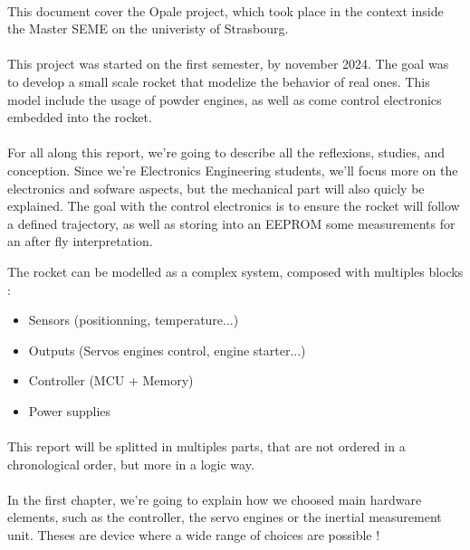 \paragraph{}
This document cover the Opale project, which took place in the context inside the Master SEME
on the univeristy of Strasbourg.

\paragraph{}
This project was started on the first semester, by november 2024. The goal was to develop a
small scale rocket that modelize the behavior of real ones. This model include the usage
of powder engines, as well as come control electronics embedded into the rocket.

\paragraph{}
For all along this report, we're going to describe all the reflexions, studies, and conception.
Since we're Electronics Engineering students, we'll focus more on the electronics and sofware aspects,
but the mechanical part will also quicly be explained.
The goal with the control electronics is to ensure the rocket will follow a defined trajectory, as
well as storing into an EEPROM some measurements for an after fly interpretation.

The rocket can be modelled as a complex system, composed with multiples blocks :

\begin{itemize}[noitemsep]
    \item   Sensors (positionning, temperature...)
    \item   Outputs (Servos engines control, engine starter...)
    \item   Controller (MCU + Memory)
    \item   Power supplies
\end{itemize}

\paragraph{}
This report will be splitted in multiples parts, that are not ordered in a chronological order, but
more in a logic way.

\paragraph{}
In the first chapter, we're going to explain how we choosed main hardware elements, such as the controller,
the servo engines or the inertial measurement unit. Theses are device where a wide range of choices are possible !

